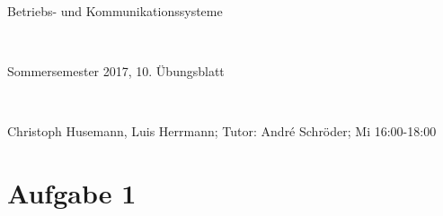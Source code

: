 \documentclass[numbers=noendperiod]{scrartcl}
\begin{document}
	
	\setlength{\parindent}{0em} 
	
	\newcommand{\inputmintedframed}[2]{
		\begin{mdframed}[linecolor=bg,backgroundcolor=bg]
			\inputminted[mathescape,breaklines,linenos,numbersep=5pt,tabsize=3]{#1}{#2}
	\end{mdframed}}
	
	\hrulefill
	\begin{center}
		\bfseries %
		\sffamily %
		\begin{huge}
			Betriebs- und Kommunikationssysteme
		\end{huge}\\
		\begin{Large}
			Sommersemester 2017, 10. Übungsblatt
		\end{Large}\\
		\begin{small}
			Christoph Husemann, Luis Herrmann; Tutor: André Schröder; Mi 16:00-18:00
		\end{small}
		
		\vspace{-10pt}
	\end{center}
	\hrulefill
	
\section*{Aufgabe 1}
\end{document}
